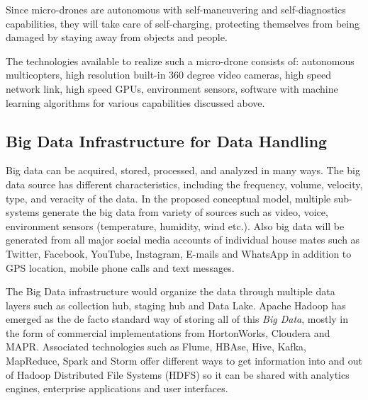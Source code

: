\documentclass[sigconf]{acmart}
\begin{document}
Since micro-drones are autonomous with self-maneuvering and self-diagnostics capabilities, they will take care of self-charging, protecting themselves from being damaged by staying away from objects and people.

The technologies available to realize such a micro-drone consists of: autonomous multicopters, high resolution built-in 360 degree video cameras, high speed network link, high speed GPUs, environment sensors, software with machine learning algorithms for various capabilities discussed above.


\subsection{Big Data Infrastructure for Data Handling }
Big data can be acquired, stored, processed, and analyzed in many ways. The big data source has different characteristics, including the frequency, volume, velocity, type, and veracity of the data. In the proposed conceptual model, multiple sub-systems generate the big data from variety of sources such as video, voice, environment sensors (temperature, humidity, wind etc.). Also big data will be generated from all major social media accounts of individual house mates such as Twitter, Facebook, YouTube, Instagram, E-mails and WhatsApp in addition to GPS location, mobile phone calls and text messages.

The Big Data infrastructure would organize the data through multiple data layers such as collection hub, staging hub and Data Lake. Apache Hadoop has emerged as the de facto standard way of storing all of this \textit{Big Data}, mostly in the form of commercial implementations from HortonWorks, Cloudera and MAPR. Associated technologies such as Flume, HBAse, Hive, Kafka, MapReduce, Spark and Storm offer different ways to get information into and out of Hadoop Distributed File Systems (HDFS) so it can be shared with analytics engines, enterprise applications and user interfaces.
\end{document}
